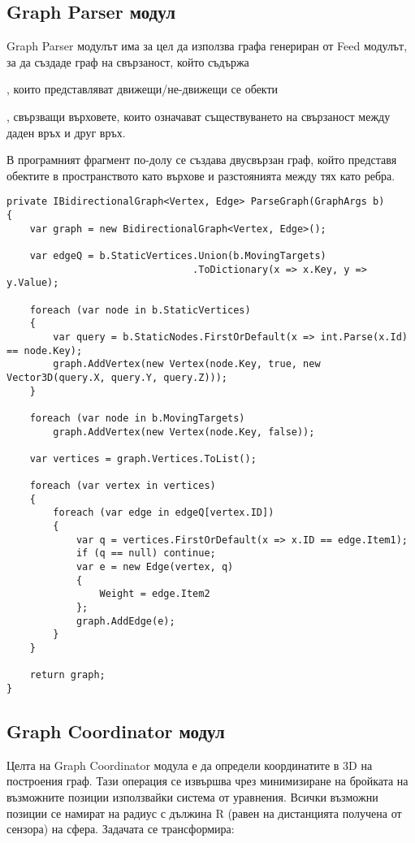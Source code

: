 \pagebreak

\subsection{Graph Parser модул}
Graph Parser модулът има за цел да използва графа генериран от Feed модулът, за да създаде граф на свързаност, който съдържа
\begin{enumerate}

, които представляват движещи/не-движещи се обекти 

, свързващи върховете, които означават съществуването на свързаност между
даден връх и друг връх.\\

\end{enumerate}

В програмният фрагмент по-долу се създава двусвързан граф, който представя обектите в пространството като върхове и разстоянията между тях като ребра.
\begin{lstlisting}
private IBidirectionalGraph<Vertex, Edge> ParseGraph(GraphArgs b)
{
    var graph = new BidirectionalGraph<Vertex, Edge>();

    var edgeQ = b.StaticVertices.Union(b.MovingTargets)
                                .ToDictionary(x => x.Key, y => y.Value);

    foreach (var node in b.StaticVertices)
    {
        var query = b.StaticNodes.FirstOrDefault(x => int.Parse(x.Id) == node.Key);
        graph.AddVertex(new Vertex(node.Key, true, new Vector3D(query.X, query.Y, query.Z)));
    }

    foreach (var node in b.MovingTargets)
        graph.AddVertex(new Vertex(node.Key, false));

    var vertices = graph.Vertices.ToList();

    foreach (var vertex in vertices)
    {
        foreach (var edge in edgeQ[vertex.ID])
        {
            var q = vertices.FirstOrDefault(x => x.ID == edge.Item1);
            if (q == null) continue;
            var e = new Edge(vertex, q)
            {
                Weight = edge.Item2
            };
            graph.AddEdge(e);
        }
    }

    return graph;
}
\end{lstlisting}

\pagebreak

\subsection{Graph Coordinator модул}
Целта на Graph Coordinator модула е да определи координатите в 3D на построения граф. Тази операция се извършва чрез минимизиране на бройката на възможните позиции използвайки система от уравнения. Всички възможни позиции се намират на радиус с дължина R (равен на дистанцията получена от сензора) на сфера. Задачата се трансформира:\\

